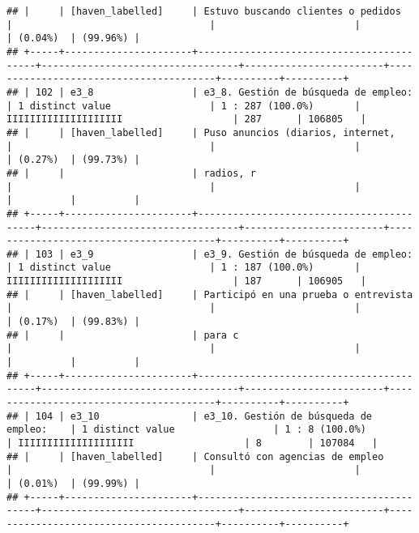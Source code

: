 \documentclass[]{article}
\begin{document}
\begin{verbatim}
## |     | [haven_labelled]     | Estuvo buscando clientes o pedidos       |                                  |                        |                                        | (0.04%)  | (99.96%) |
## +-----+----------------------+------------------------------------------+----------------------------------+------------------------+----------------------------------------+----------+----------+
## | 102 | e3_8                 | e3_8. Gestión de búsqueda de empleo:     | 1 distinct value                 | 1 : 287 (100.0%)       | IIIIIIIIIIIIIIIIIIII                   | 287      | 106805   |
## |     | [haven_labelled]     | Puso anuncios (diarios, internet,        |                                  |                        |                                        | (0.27%)  | (99.73%) |
## |     |                      | radios, r                                |                                  |                        |                                        |          |          |
## +-----+----------------------+------------------------------------------+----------------------------------+------------------------+----------------------------------------+----------+----------+
## | 103 | e3_9                 | e3_9. Gestión de búsqueda de empleo:     | 1 distinct value                 | 1 : 187 (100.0%)       | IIIIIIIIIIIIIIIIIIII                   | 187      | 106905   |
## |     | [haven_labelled]     | Participó en una prueba o entrevista     |                                  |                        |                                        | (0.17%)  | (99.83%) |
## |     |                      | para c                                   |                                  |                        |                                        |          |          |
## +-----+----------------------+------------------------------------------+----------------------------------+------------------------+----------------------------------------+----------+----------+
## | 104 | e3_10                | e3_10. Gestión de búsqueda de empleo:    | 1 distinct value                 | 1 : 8 (100.0%)         | IIIIIIIIIIIIIIIIIIII                   | 8        | 107084   |
## |     | [haven_labelled]     | Consultó con agencias de empleo          |                                  |                        |                                        | (0.01%)  | (99.99%) |
## +-----+----------------------+------------------------------------------+----------------------------------+------------------------+----------------------------------------+----------+----------+

\end{verbatim}
\end{document}
